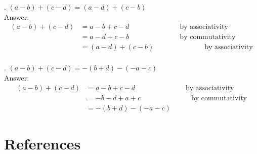 \documentclass{article}
\begin{document}
. $(a - b) + (c - d) = (a - d) + (c - b)$\\
Answer:\\
\begin{align*}
    (a - b) + (c - d) &= a - b + c - d \hspace{3cm} \text{by associativity}\\
    &= a - d + c - b \hspace{3cm} \text{by commutativity}\\
    &= (a - d) + (c - b) \hspace{3cm} \text{by associativity}\\
\end{align*}

. $(a - b) + (c - d) = -(b + d) - (-a - c)$\\
Answer:\\
\begin{align*}
    (a - b) + (c - d) &= a - b + c - d \hspace{3cm} \text{by associativity}\\
    &= -b - d + a + c \hspace{3cm} \text{by commutativity}\\
    &= -(b + d) - (-a - c)
\end{align*}



\newpage
\section*{References}

    
\end{document}
